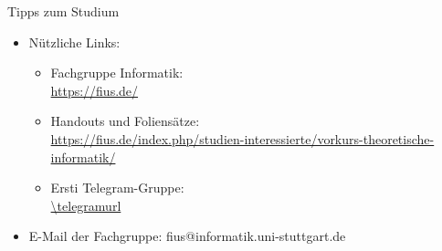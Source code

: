 %
%
%
%

\begin{frame}[fragile]{Tipps zum Studium}
    \begin{itemize}
        \item Nützliche Links:\\
              \begin{itemize}
                  \item Fachgruppe Informatik:\\
                        \url{https://fius.de/}
                  \item Handouts und Foliensätze:\\ \url{https://fius.de/index.php/studien-interessierte/vorkurs-theoretische-informatik/}
                  \item Ersti Telegram-Gruppe:\\
                        \qrcode[hyperlink]{\telegramurl}
                        \url{\telegramurl}
              \end{itemize}
        \item E-Mail der Fachgruppe: fius@informatik.uni-stuttgart.de

    \end{itemize}
\end{frame}

